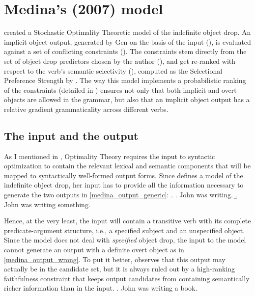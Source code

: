 \setchapterpreamble[u]{\margintoc}
\chapter{Medina's (2007) model}


\textcite{Medina2007} created a Stochastic Optimality Theoretic model of the indefinite object drop. An implicit object output, generated by Gen on the basis of the input (), is evaluated against a set of conflicting constraints (). The constraints stem directly from the set of object drop predictors chosen by the author (), and get re-ranked with respect to the verb's semantic selectivity (), computed as the Selectional Preference Strength by \textcite{Resnik1993, Resnik1996}. The way this model implements a probabilistic ranking of the constraints (detailed in ) ensures not only that both implicit and overt objects are allowed in the grammar, but also that an implicit object output has a relative gradient grammaticality across different verbs.


\section{The input and the output} 

As I mentioned in , Optimality Theory requires the input to syntactic optimization to contain the relevant lexical and semantic components that will be mapped to syntactically well-formed output forms. Since \textcite{Medina2007} defines a model of the indefinite object drop, her input has to provide all the information necessary to generate the two outputs in  \ref{medina_output_generic}:
\ex. \label{medina_output_generic} \a. John was writing.
\b. John was writing something.

Hence, at the very least, the input will contain a transitive verb with its complete predicate-argument structure, i.e., a specified subject and an unspecified object. Since the model does not deal with \textit{specified} object drop, the input to the model cannot generate an output with a definite overt object as in \ref{medina_output_wrong}. To put it better, \textcite[70-71]{Medina2007} observes that this output may actually be in the candidate set, but it is always ruled out by a high-ranking faithfulness constraint that keeps output candidates from containing semantically richer information than in the input.
\ex. \label{medina_output_wrong} John was writing a book.

